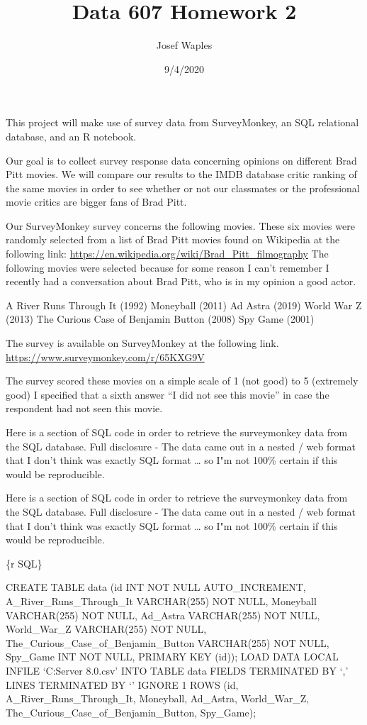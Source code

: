 \documentclass[]{article}
\title{Data 607 Homework 2}
\author{Josef Waples}
\date{9/4/2020}
\begin{document}
\maketitle

This project will make use of survey data from SurveyMonkey, an SQL
relational database, and an R notebook.

Our goal is to collect survey response data concerning opinions on
different Brad Pitt movies. We will compare our results to the IMDB
database critic ranking of the same movies in order to see whether or
not our classmates or the professional movie critics are bigger fans of
Brad Pitt.

Our SurveyMonkey survey concerns the following movies. These six movies
were randomly selected from a list of Brad Pitt movies found on
Wikipedia at the following link:
\url{https://en.wikipedia.org/wiki/Brad_Pitt_filmography} The following
movies were selected because for some reason I can't remember I recently
had a conversation about Brad Pitt, who is in my opinion a good actor.

A River Runs Through It (1992) Moneyball (2011) Ad Astra (2019) World
War Z (2013) The Curious Case of Benjamin Button (2008) Spy Game (2001)

The survey is available on SurveyMonkey at the following link.
\url{https://www.surveymonkey.com/r/65KXG9V}

The survey scored these movies on a simple scale of 1 (not good) to 5
(extremely good) I specified that a sixth answer ``I did not see this
movie'' in case the respondent had not seen this movie.

Here is a section of SQL code in order to retrieve the surveymonkey data
from the SQL database. Full disclosure - The data came out in a nested /
web format that I don't think was exactly SQL format \ldots{} so I"m not
100\% certain if this would be reproducible.

Here is a section of SQL code in order to retrieve the surveymonkey data
from the SQL database. Full disclosure - The data came out in a nested /
web format that I don't think was exactly SQL format \ldots{} so I"m not
100\% certain if this would be reproducible.

\{r SQL\}

CREATE TABLE data (id INT NOT NULL AUTO\_INCREMENT,
A\_River\_Runs\_Through\_It VARCHAR(255) NOT NULL, Moneyball
VARCHAR(255) NOT NULL, Ad\_Astra VARCHAR(255) NOT NULL, World\_War\_Z
VARCHAR(255) NOT NULL, The\_Curious\_Case\_of\_Benjamin\_Button
VARCHAR(255) NOT NULL, Spy\_Game INT NOT NULL, PRIMARY KEY (id)); LOAD
DATA LOCAL INFILE `C:\ProgramData\MySQL\MySQL Server
8.0\Uploads\moviedata.csv' INTO TABLE data FIELDS TERMINATED BY `,'
LINES TERMINATED BY `\n' IGNORE 1 ROWS (id, A\_River\_Runs\_Through\_It,
Moneyball, Ad\_Astra, World\_War\_Z,
The\_Curious\_Case\_of\_Benjamin\_Button, Spy\_Game);
\end{document}
